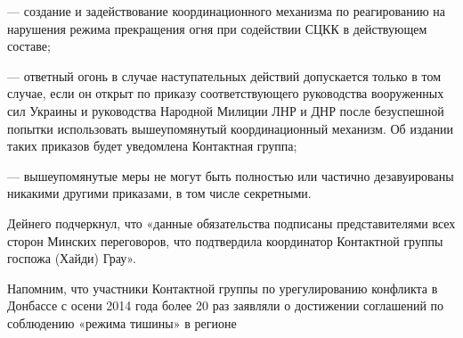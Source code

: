 --- создание и задействование координационного механизма по реагированию на
нарушения режима прекращения огня при содействии СЦКК в действующем составе;

--- ответный огонь в случае наступательных действий допускается только в том
случае, если он открыт по приказу соответствующего руководства вооруженных сил
Украины и руководства Народной Милиции ЛНР и ДНР после безуспешной попытки
использовать вышеупомянутый координационный механизм. Об издании таких приказов
будет уведомлена Контактная группа;

--- вышеупомянутые меры не могут быть полностью или частично дезавуированы
никакими другими приказами, в том числе секретными.

Дейнего подчеркнул, что «данные обязательства подписаны представителями всех
сторон Минских переговоров, что подтвердила координатор Контактной группы
госпожа (Хайди) Грау».

Напомним, что участники Контактной группы по урегулированию конфликта в
Донбассе с осени 2014 года более 20 раз заявляли о достижении соглашений по
соблюдению «режима тишины» в регионе
